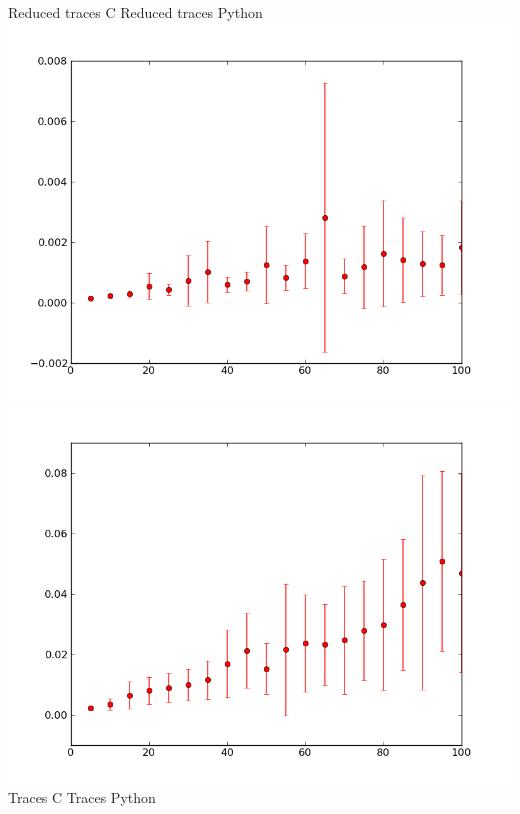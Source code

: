 \documentclass[10pt]{article}
\begin{document}
\begin{center}
Reduced traces C \qquad \qquad \qquad\qquad\qquad\qquad \qquad Reduced traces Python \\
\includegraphics[scale=0.4]{../graphs/categorical/categorical-traces-c-time.png}
\includegraphics[scale=0.4]{../graphs/categorical/categorical-traces-py-time.png} \\
Traces C \qquad\qquad\qquad\qquad\qquad\qquad \qquad Traces Python \\
\end{center}
%
%
\end{document}
